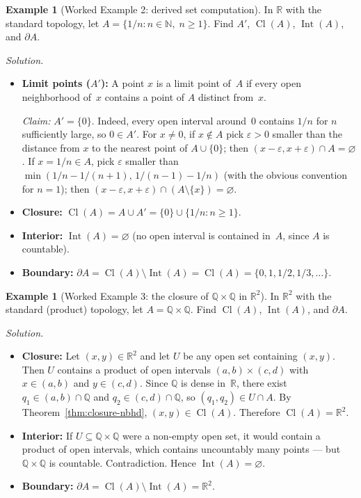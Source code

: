 \documentclass[11pt,a4paper,twoside]{book}
\theoremstyle{remark}
\theoremstyle{definition}
\newtheorem{exampleplain}[theorem]{Example}
\theoremstyle{definition}
\newcommand{\boundary}{\partial}         %
\newcommand{\R}{\mathbb{R}}
\newcommand{\N}{\mathbb{N}}
\newcommand{\Q}{\mathbb{Q}}
\DeclareMathOperator{\Int}{Int}
\DeclareMathOperator{\Cl}{Cl}
\begin{document}
\begin{exampleplain}[Worked Example 2: derived set computation]
\label{ex:ch2-worked2}
In $\R$ with the standard topology, let $A=\{1/n:n\in\N,\;n\geq 1\}$.
Find $A'$, $\Cl(A)$, $\Int(A)$, and $\boundary A$.

\emph{Solution.}
\begin{itemize}
  \item \textbf{Limit points ($A'$):}  A point $x$ is a limit point of~$A$ if
        every open neighborhood of~$x$ contains a point of $A$ distinct from~$x$.

        \emph{Claim:} $A'=\{0\}$.  Indeed, every open interval around~$0$
        contains $1/n$ for $n$ sufficiently large, so $0\in A'$.  For
        $x\neq 0$, if $x\notin A$ pick $\varepsilon>0$ smaller than the
        distance from $x$ to the nearest point of $A\cup\{0\}$; then
        $(x-\varepsilon,x+\varepsilon)\cap A=\varnothing$.  If $x=1/n\in A$,
        pick $\varepsilon$ smaller than $\min(1/n-1/(n+1),\,1/(n-1)-1/n)$
        (with the obvious convention for $n=1$); then
        $(x-\varepsilon,x+\varepsilon)\cap(A\setminus\{x\})=\varnothing$.
  \item \textbf{Closure:} $\Cl(A)=A\cup A'=\{0\}\cup\{1/n:n\geq 1\}$.
  \item \textbf{Interior:} $\Int(A)=\varnothing$ (no open interval is
        contained in~$A$, since $A$ is countable).
  \item \textbf{Boundary:} $\boundary A=\Cl(A)\setminus\Int(A)=\Cl(A)
        =\{0,1,1/2,1/3,\ldots\}$.
\end{itemize}
\end{exampleplain}

\begin{exampleplain}[Worked Example 3: the closure of $\Q\times\Q$ in $\R^2$]
\label{ex:ch2-worked3}
In $\R^2$ with the standard (product) topology, let $A=\Q\times\Q$.
Find $\Cl(A)$, $\Int(A)$, and $\boundary A$.

\emph{Solution.}
\begin{itemize}
  \item \textbf{Closure:} Let $(x,y)\in\R^2$ and let $U$ be any open set
        containing $(x,y)$.  Then $U$ contains a product of open intervals
        $(a,b)\times(c,d)$ with $x\in(a,b)$ and $y\in(c,d)$.  Since $\Q$ is
        dense in~$\R$, there exist $q_1\in(a,b)\cap\Q$ and
        $q_2\in(c,d)\cap\Q$, so $(q_1,q_2)\in U\cap A$.  By
        Theorem~\ref{thm:closure-nbhd}, $(x,y)\in\Cl(A)$.  Therefore
        $\Cl(A)=\R^2$.
  \item \textbf{Interior:} If $U\subseteq\Q\times\Q$ were a non-empty open set,
        it would contain a product of open intervals, which contains
        uncountably many points --- but $\Q\times\Q$ is countable.
        Contradiction.  Hence $\Int(A)=\varnothing$.
  \item \textbf{Boundary:} $\boundary A=\Cl(A)\setminus\Int(A)=\R^2$.
\end{itemize}
\end{exampleplain}
\end{document}
